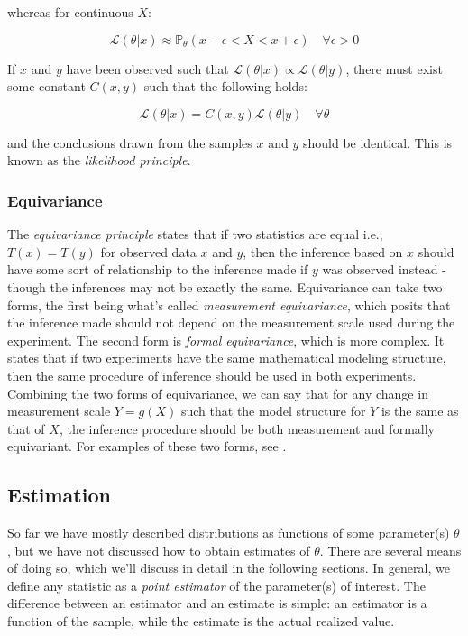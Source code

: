 \documentclass{report}
\begin{document}
whereas for continuous $X$:

\begin{equation}\label{eq:likelihood-function-continuous}
    \mathcal{L}(\theta|x) \approx \mathbb{P}_\theta(x - \epsilon < X < x + \epsilon) \quad \forall \epsilon > 0
\end{equation}

If $x$ and $y$ have been observed such that $\mathcal{L}(\theta|x) \propto \mathcal{L}(\theta|y)$, there must exist some constant $C(x,y)$ such that the following holds:

\begin{equation}\label{eq:likelihood principle}
    \mathcal{L}(\theta|x) = C(x,y) \mathcal{L}(\theta|y) \quad \forall \theta 
\end{equation}

and the conclusions drawn from the samples $x$ and $y$ should be identical. This is known as the \textit{likelihood principle}. 

\subsubsection{Equivariance}

The \textit{equivariance principle} states that if two statistics are equal i.e., $T(x) = T(y)$ for observed data $x$ and $y$, then the inference based on $x$ should have some sort of relationship to the inference made if $y$ was observed instead - though the inferences may not be exactly the same. Equivariance can take two forms, the first being what's called \textit{measurement equivariance}, which posits that the inference made should not depend on the measurement scale used during the experiment. The second form is \textit{formal equivariance}, which is more complex. It states that if two experiments have the same mathematical modeling structure, then the same procedure of inference should be used in both experiments. Combining the two forms of equivariance, we can say that for any change in measurement scale $Y = g(X)$ such that the model structure for $Y$ is the same as that of $X$, the inference procedure should be both measurement and formally equivariant. For examples of these two forms, see \cite[Chapter~6.4]{casella_statistical_2002}. 

\subsection{Estimation}

So far we have mostly described distributions as functions of some parameter(s) $\theta$, but we have not discussed how to obtain estimates of $\theta$. There are several means of doing so, which we'll discuss in detail in the following sections. In general, we define any statistic as a \textit{point estimator} of the parameter(s) of interest. The difference between an estimator and an estimate is simple: an estimator is a function of the sample, while the estimate is the actual realized value. 
\end{document}
